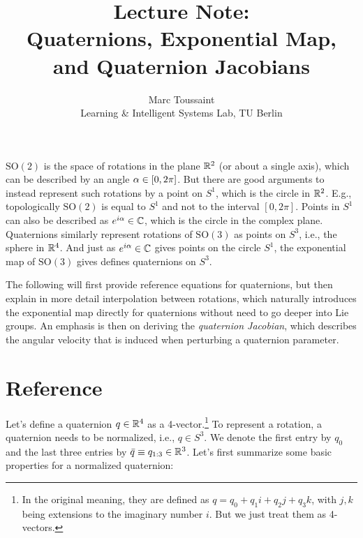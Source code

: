 
\note

\title{Lecture Note:\\ Quaternions, Exponential Map, and Quaternion Jacobians}
\author{Marc Toussaint\\\small Learning \& Intelligent Systems Lab, TU Berlin}

\renewcommand{\t}{\theta}
\renewcommand{\hat}{\widehat}
\newcommand{\bbg}{{\bar{\bar g}}}
\newcommand{\ul}{\widehat}
\newcommand{\bd}{\boldsymbol}
\newcommand{\SE}{\text{SE}}
\newcommand{\SO}{\text{SO}}
\newcommand{\nor}{\text{normalize}}
\newcommand{\skew}{\text{skew}}

\notetitle


$\SO(2)$ is the space of rotations in the plane ${\mathbb{R}}^2$ (or about a
single axis), which can be
described by an angle $\alpha\in[0,2\pi]$. But there are good arguments to
instead represent such rotations by a point on $S^1$, which is the
circle in ${\mathbb{R}}^2$. E.g., topologically $\SO(2)$ is equal to $S^1$
and not to the interval $[0,2\pi]$. Points in $S^1$ can also be described as
$e^{i\alpha} \in{\mathbb{C}}$, which is the circle in the complex
plane. Quaternions similarly represent rotations of $\SO(3)$ as points
on $S^3$, i.e., the sphere in ${\mathbb{R}}^4$. And just as $e^{i\alpha} \in{\mathbb{C}}$
gives points on the circle $S^1$, the exponential map of $\SO(3)$
gives defines quaternions on $S^3$.

The following will first provide reference equations for quaternions,
but then explain in more detail interpolation between rotations, which
naturally introduces the exponential map directly for quaternions
without need to go deeper into Lie groups. An emphasis is then on
deriving the \emph{quaternion Jacobian}, which describes the
angular velocity that is induced when perturbing a
quaternion parameter.


\section{Reference}

Let's define a quaternion $q\in{\mathbb{R}}^4$ as a 4-vector.\footnote{In the
original meaning, they are defined as $q = q_0 + q_1 i + q_2 j + q_3
k$, with $j,k$ being extensions to the imaginary number $i$. But we
just treat them as 4-vectors.} To represent a rotation, a quaternion
needs to be normalized, i.e., $q\in S^3$. We denote the first entry by
$q_0$ and the last three
entries by $\bar q\equiv q_{1:3} \in{\mathbb{R}}^3$. Let's first summarize
some basic properties for a normalized quaternion:

